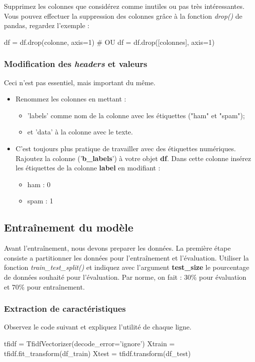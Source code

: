 Supprimez les colonnes que considérez comme inutiles ou pas très intéressantes. Vous pouvez effectuer la suppression des colonnes grâce à la fonction \textit{drop()} de pandas, regardez l'exemple :

\begin{python}
df = df.drop(colonne, axis=1) # OU
df = df.drop([colonnes], axis=1)
\end{python}

\subsubsection{Modification des \textit{headers} et valeurs}
Ceci n'est pas essentiel, mais important du même.
\begin{itemize}
	\item Renommez les colonnes en mettant :
	\begin{itemize}
		\item 'labels' comme nom de la colonne avec les étiquettes ("ham" et "spam");
		\item et 'data' à la colonne avec le texte.
	\end{itemize}
	\item C'est toujours plus pratique de travailler avec des étiquettes numériques. Rajoutez la colonne ('\textbf{b\_labels}') à votre objet \textbf{df}. Dans cette colonne insérez les étiquettes de la colonne \textbf{label} en modifiant :
	\begin{itemize}
		\item ham : 0
		\item spam : 1
	\end{itemize}
\end{itemize}

\subsection{Entraînement du modèle}

Avant l'entraînement, nous devons preparer les données. La première étape consiste a partitionner les données pour l'entraînement et l'évaluation. Utiliser la fonction \textit{train\_test\_split()} et indiquez avec l'argument \textbf{test\_size} le pourcentage de données souhaité pour l'évaluation. Par norme, on fait : 30\% pour évaluation et 70\% pour entraînement.

\subsubsection{Extraction de caractéristiques}
Observez le code suivant et expliquez l'utilité de chaque ligne.
\begin{python}
tfidf = TfidfVectorizer(decode_error='ignore')
Xtrain = tfidf.fit_transform(df_train)
Xtest = tfidf.transform(df_test)
\end{python}

